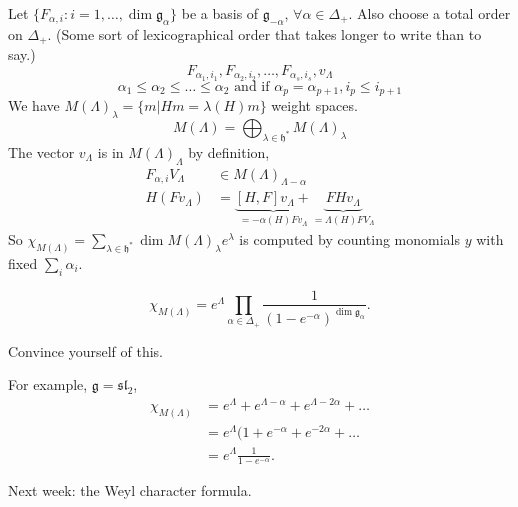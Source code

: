 Let $\{F_{\alpha,i}:i = 1,\ldots, \dim \mathfrak{g}_\alpha\}$ be a basis of
$\mathfrak{g}_{-\alpha}$, $\forall \alpha \in \Delta_+$. 
Also choose a total order on $\Delta_+$. (Some sort of lexicographical order
that takes longer to write than to say.)
$$
F_{\alpha_1,i_1},F_{\alpha_2,i_2},\ldots,F_{\alpha_s,i_s},v_\Lambda
$$
$$
\alpha_1\leq \alpha_2\leq \ldots \leq \alpha_2\text{ and if }
\alpha_p=\alpha_{p+1}, i_p \leq  i_{p+1}
$$
We have $M(\Lambda)_\lambda=\{m|Hm=\lambda(H)m\}$ weight spaces.
$$
M(\Lambda)=\bigoplus_{\lambda \in \mathfrak{h}^*}M(\Lambda)_\lambda
$$
The vector $v_{\Lambda}$ is in $M(\Lambda)_\Lambda$ by definition,
\begin{align*}
F_{\alpha,i}V_\Lambda &\in M(\Lambda)_{\Lambda-\alpha}\\
H(Fv_\Lambda)&=\underbrace{[H,F]v_\Lambda+}_{=-\alpha(H)Fv_\Lambda}
\underbrace{FHv_\Lambda}_{=\Lambda(H)FV_\Lambda}
\end{align*}
So $\chi_{M(\Lambda)}=\sum_{\lambda \in \mathfrak{h}^*}\dim M(\Lambda)_\lambda
e^{\lambda}$
is computed by counting monomials $y$ with fixed $\sum_{i}\alpha_i$.

$$
\chi_{M(\Lambda)}=e^{\Lambda}\prod_{\alpha \in \Delta_+}
\frac{1}{(1-e^{-\alpha})^{\dim \mathfrak{g}_\alpha}}.
$$
\begin{exercise}
\label{exercise-convince-yourself}
Convince yourself of this.
\end{exercise}

For example, $\mathfrak{g}=\mathfrak{sl}_2$,
\begin{align*}
\chi_{M(\Lambda)}&=e^{\Lambda}+e^{\Lambda-\alpha}+e^{\Lambda-2\alpha}+\ldots\\
&=e^{\Lambda}(1+e^{-\alpha}+e^{-2\alpha}+\ldots\\
&=e^{\Lambda}\frac{1}{1-e^{-\alpha}}.
\end{align*}

Next week: the Weyl character formula.








